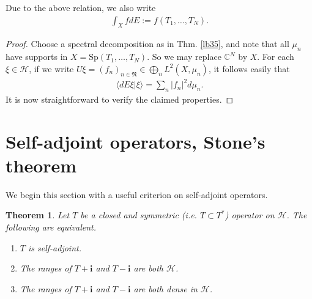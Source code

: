 \documentclass[12pt,a4paper,notitlepage]{article}
\theoremstyle{definition}
\theoremstyle{plain}
\newtheorem{thm}[df]{Theorem}
\newcommand{\fk}{\mathfrak}
\newcommand{\mc}{\mathcal}
\newcommand{\bk}[1]{\langle {#1}\rangle}
\newcommand{\im}{\mathbf{i}}
\newcommand{\Cbb}{\mathbb C}
\newcommand{\Sp}{\mathrm{Sp}}
\numberwithin{equation}{section}
\begin{document}
Due to the above relation, we also write
\begin{align}
\int_Xf dE:=f(T_1,\dots,T_N).	
\end{align}


\begin{proof}
Choose a spectral decomposition as in Thm. \ref{lb35}, and note that all $\mu_n$ have supports in $X=\Sp(T_1,\dots,T_N)$. So we may replace $\Cbb^N$ by $X$. For each $\xi\in\mc H$, if we write $U\xi=(f_n)_{n\in\fk N}\in\bigoplus_n L^2(X,\mu_n)$, it follows easily that
\begin{align}
\bk{dE\xi|\xi}=\sum_n |f_n|^2d\mu_n.
\end{align}
It is now straightforward to verify the claimed properties.
\end{proof}






\section{Self-adjoint operators, Stone's theorem}


We begin this section with a useful criterion on self-adjoint operators.

\begin{thm}
Let $T$ be a closed and symmetric (i.e. $T\subset T^*$) operator on $\mc H$. The following are equivalent.
\begin{enumerate}[label=(\alph*)]
\item $T$ is self-adjoint.
\item The ranges of $T+\im$ and $T-\im$ are both $\mc H$.
\item  The ranges of $T+\im$ and $T-\im$ are both dense in $\mc H$.
\end{enumerate}
\end{thm}
\end{document}
